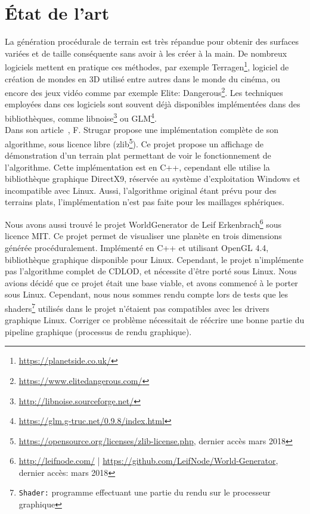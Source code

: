 \chapter*{État de l'art}
\setcounter{chapter}{0}

La génération procédurale de terrain est très répandue pour obtenir des
surfaces variées et de taille conséquente sans avoir à les créer à la
main. De nombreux logiciels mettent en pratique ces méthodes, par
exemple Terragen\footnote{\url{https://planetside.co.uk/}}, logiciel de
création de mondes en 3D utilisé entre autres dans le monde du cinéma,
ou encore des jeux vidéo comme par exemple Elite:
Dangerous\footnote{\url{https://www.elitedangerous.com/}}. Les
techniques employées dans ces logiciels sont souvent déjà disponibles
implémentées dans des bibliothèques, comme
libnoise\footnote{\url{http://libnoise.sourceforge.net/}} ou
GLM\footnote{\url{https://glm.g-truc.net/0.9.8/index.html}}.\\


Dans son article~\cite{CDLOD}, F. Strugar propose une implémentation
complète de son algorithme, sous licence libre
(zlib\footnote{\url{https://opensource.org/licenses/zlib-license.php},
dernier accès mars 2018}). Ce projet propose un affichage de
démonstration d'un terrain plat permettant de voir le fonctionnement de
l'algorithme. Cette implémentation est en C++, cependant elle utilise la
bibliothèque graphique DirectX9, réservée au système d'exploitation
Windows et incompatible avec Linux. Aussi, l'algorithme original étant
prévu pour des terrains plats, l'implémentation n'est pas faite pour les
maillages sphériques.

Nous avons aussi trouvé le projet WorldGenerator de Leif
Erkenbrach\footnote{\url{http://leifnode.com/} |
\url{https://github.com/LeifNode/World-Generator}, dernier accès: mars
2018} sous licence MIT. Ce projet permet de visualiser une planète en
trois dimensions générée procéduralement. Implémenté en C++ et utilisant
OpenGL 4.4, bibliothèque graphique disponible pour Linux. Cependant, le
projet n'implémente pas l'algorithme complet de CDLOD, et nécessite
d'être porté sous Linux. Nous avions décidé que ce projet était une base
viable, et avons commencé à le porter sous Linux. Cependant, nous nous
sommes rendu compte lors de tests que les
shaders\footnote{\texttt{Shader:} programme effectuant une partie du
rendu sur le processeur graphique} utilisés dans le projet
n'étaient pas compatibles avec les drivers graphique Linux.  Corriger ce
problème nécessitait de réécrire une bonne partie du pipeline graphique
(processus de rendu graphique). 

